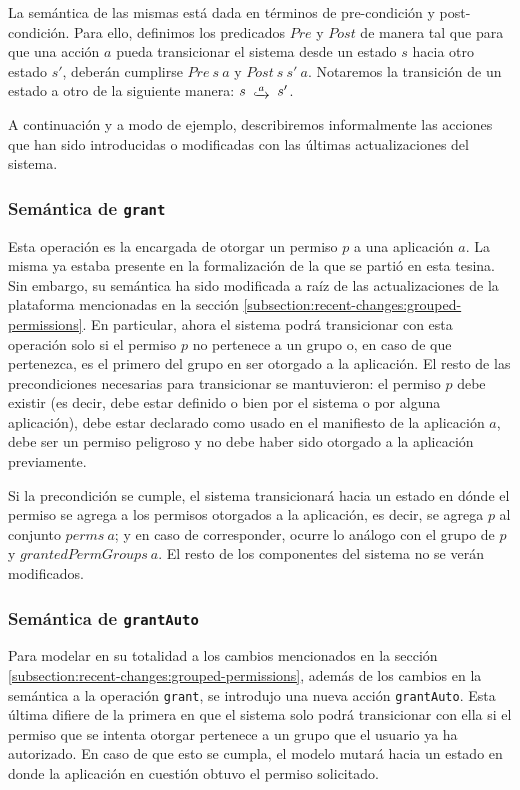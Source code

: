La semántica de las mismas está dada en términos de pre-condición y post-condición. Para ello,
definimos los predicados $Pre$ y $Post$ de manera tal que para que una acción $a$ pueda transicionar
el sistema desde un estado $s$ hacia otro estado $s'$, deberán cumplirse $Pre\ s\ a$ y $Post\ s\ s'\
    a$. Notaremos la transición de un estado a otro de la siguiente manera: $s\ \step{a}\ s'$.

A continuación y a modo de ejemplo, describiremos informalmente las acciones que han sido introducidas
o modificadas con las últimas actualizaciones del sistema.

\subsubsection{Semántica de \texttt{grant}}

Esta operación es la encargada de otorgar un permiso $p$ a una aplicación $a$. La misma ya estaba
presente en la formalización de la que se partió en esta tesina. Sin embargo, su semántica ha sido
modificada a raíz de las actualizaciones de la plataforma mencionadas en la sección
\ref{subsection:recent-changes:grouped-permissions}. En particular, ahora el sistema podrá
transicionar con esta operación solo si  el permiso $p$ no pertenece a un grupo o, en caso de que
pertenezca, es el primero del grupo en ser otorgado a la aplicación. El resto de las precondiciones
necesarias para transicionar se mantuvieron: el permiso $p$ debe existir (es decir, debe estar
definido o bien por el sistema o por alguna aplicación), debe estar declarado como usado en el
manifiesto de la aplicación $a$, debe ser un permiso peligroso y no debe haber sido otorgado a la
aplicación previamente.

Si la precondición se cumple, el sistema transicionará hacia un estado en dónde el permiso se agrega a
los permisos otorgados a la aplicación, es decir, se agrega $p$ al conjunto $perms\ a$; y en caso de
corresponder, ocurre lo análogo con el grupo de $p$ y $grantedPermGroups\ a$. El resto de los
componentes del sistema no se verán modificados.

\subsubsection{Semántica de \texttt{grantAuto}}

Para modelar en su totalidad a los cambios mencionados en la sección
\ref{subsection:recent-changes:grouped-permissions}, además de los cambios en la semántica a la
operación \texttt{grant}, se introdujo una nueva acción \texttt{grantAuto}. Esta última difiere de la
primera en que el sistema solo podrá transicionar con ella si el permiso que se intenta otorgar
pertenece a un grupo que el usuario ya ha autorizado. En caso de que esto se cumpla, el modelo mutará
hacia un estado en donde la aplicación en cuestión obtuvo el permiso solicitado.

